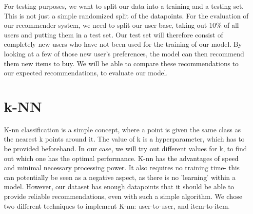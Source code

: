 \documentclass[11pt]{article}
\begin{document}
For testing purposes, we want to split our data into a training and a testing set. This is not just a simple randomized split of the datapoints. For the evaluation of our recommender system, we need to split our user base, taking out 10\% of all users and putting them in a test set. Our test set will therefore consist of completely new users who have not been used for the training of our model. By looking at a few of those new user's preferences, the model can then recommend them new items to buy. We will be able to compare these recommendations to our expected recommendations, to evaluate our model.

\section{k-NN}
K-nn classification is a simple concept, where a point is given the same class as the nearest k points around it. The value of k is a hyperparameter, which has to be provided beforehand. In our case, we will try out different values for k, to find out which one has the optimal performance. K-nn has the advantages of speed and minimal necessary processing power. It also requires no training time- this can potentially be seen as a negative aspect, as there is no 'learning' within a model. However, our dataset has enough datapoints that it should be able to provide reliable recommendations, even with such a simple algorithm. We chose two different techniques to implement K-nn: user-to-user, and item-to-item.
\end{document}
